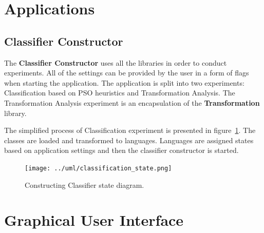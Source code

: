 \documentclass{mini}
\begin{document}
\section{Applications}

\subsection{Classifier Constructor}

The {\bf Classifier Constructor} uses all the libraries in order to conduct experiments. All of the settings can be provided by the user in a form of flags when starting the application. The application is split into two experiments: Classification based on PSO heuristics and Transformation Analysis. The Transformation Analysis experiment is an encapsulation of the {\bf Transformation} library.

The simplified process of Classification experiment is presented in figure~\ref{fig:classification_states}. The classes are loaded and transformed to languages. Languages are assigned states based on application settings and then the classifier constructor is started.

\begin{figure}
    \centering
    \texttt{[image: ../uml/classification\_state.png]}
    \caption{Constructing Classifier state diagram.}
    \label{fig:classification_states}
\end{figure}

\newpage

\section{Graphical User Interface}
\end{document}

